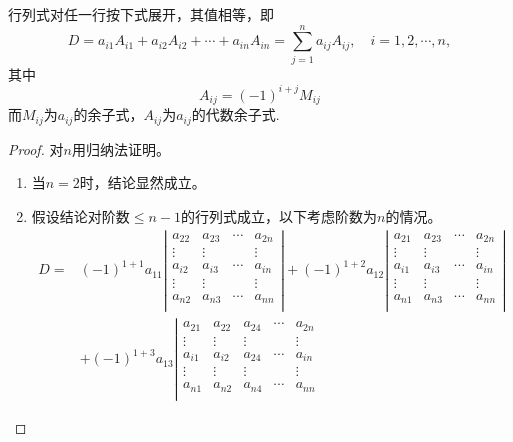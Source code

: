 \begin{xingzhi}
  行列式对任一行按下式展开，其值相等，即
  $$
  D = a_{i1} A_{i1} + a_{i2} A_{i2} + \cdots + a_{in}A_{in} = \sum_{j=1}^n a_{ij} A_{ij}, \quad
  i = 1, 2, \cdots, n,
  $$
  其中
  $$
  A_{ij} = (-1)^{i+j} M_{ij}
  $$
  而$M_{ij}$为$a_{ij}$的余子式，$A_{ij}$为$a_{ij}$的代数余子式.
\end{xingzhi}
\begin{proof}
  对$n$用归纳法证明。
  \begin{enumerate}
  \item 当$n=2$时，结论显然成立。
  \item 假设结论对阶数$\le n-1$的行列式成立，以下考虑阶数为$n$的情况。
    $$
    \begin{aligned}
      D = &  (-1)^{1+1} a_{11} \left|
        \begin{array}{cccc}
          a_{22}  & a_{23}   & \cdots & a_{2n}\\
          \vdots  & \vdots & & \vdots \\
          a_{i2}  & a_{i3}   & \cdots & a_{in}\\
          \vdots & \vdots  & & \vdots \\
          a_{n2}  & a_{n3}   & \cdots & a_{nn}\\
        \end{array}
      \right| + (-1)^{1+2} a_{12} \left|
        \begin{array}{cccc}
          a_{21}  & a_{23}  & \cdots & a_{2n}\\
          \vdots & \vdots & & \vdots \\
          a_{i1}  & a_{i3}  & \cdots & a_{in}\\
          \vdots & \vdots & & \vdots \\
          a_{n1}  & a_{n3}  & \cdots & a_{nn}\\
        \end{array}
      \right|\\
      & + (-1)^{1+3} a_{13} \left|
        \begin{array}{ccccc}
          a_{21}  & a_{22} & a_{24}  & \cdots & a_{2n}\\
          \vdots & \vdots & \vdots & & \vdots \\
          a_{i1}  & a_{i2} & a_{24}  & \cdots & a_{in}\\
          \vdots & \vdots & \vdots & & \vdots \\
          a_{n1}  & a_{n2}  & a_{n4} & \cdots & a_{nn}\\
        \end{array}

\end{aligned}$$
\end{enumerate}
\end{proof}
